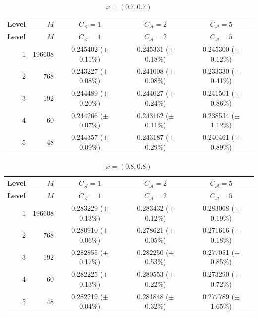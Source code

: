 \documentclass[11pt]{article}
\theoremstyle{definition}
\theoremstyle{plain}
\begin{document}
\begin{appendices}
\begin{longtable}{@{}r r c c c@{}}
\caption{$x=(0.7,0.7)$}\label{tab:mlp-x07}\\
\toprule
\textbf{Level} & \textbf{$M$} & \textbf{$C_{\mathcal A}=1$} & \textbf{$C_{\mathcal A}=2$} & \textbf{$C_{\mathcal A}=5$} \\
\midrule
\endfirsthead
\toprule
\textbf{Level} & \textbf{$M$} & \textbf{$C_{\mathcal A}=1$} & \textbf{$C_{\mathcal A}=2$} & \textbf{$C_{\mathcal A}=5$} \\
\midrule
\endhead
1 & 196608 & 0.245402 (\(\pm\) 0.11\%) & 0.245331 (\(\pm\) 0.18\%) & 0.245300 (\(\pm\) 0.12\%) \\
2 & 768    & 0.243227 (\(\pm\) 0.08\%) & 0.241008 (\(\pm\) 0.08\%) & 0.233330 (\(\pm\) 0.41\%) \\
3 & 192    & 0.244489 (\(\pm\) 0.20\%) & 0.244027 (\(\pm\) 0.24\%) & 0.241501 (\(\pm\) 0.86\%) \\
4 & 60     & 0.244266 (\(\pm\) 0.07\%) & 0.243162 (\(\pm\) 0.11\%) & 0.238534 (\(\pm\) 1.12\%) \\
5 & 48     & 0.244357 (\(\pm\) 0.09\%) & 0.243187 (\(\pm\) 0.29\%) & 0.240461 (\(\pm\) 0.89\%) \\
\bottomrule
\end{longtable}

\begin{longtable}{@{}r r c c c@{}}
\caption{$x=(0.8,0.8)$}\label{tab:mlp-x08}\\
\toprule
\textbf{Level} & \textbf{$M$} & \textbf{$C_{\mathcal A}=1$} & \textbf{$C_{\mathcal A}=2$} & \textbf{$C_{\mathcal A}=5$} \\
\midrule
\endfirsthead
\toprule
\textbf{Level} & \textbf{$M$} & \textbf{$C_{\mathcal A}=1$} & \textbf{$C_{\mathcal A}=2$} & \textbf{$C_{\mathcal A}=5$} \\
\midrule
\endhead
1 & 196608 & 0.283229 (\(\pm\) 0.13\%) & 0.283432 (\(\pm\) 0.12\%) & 0.283068 (\(\pm\) 0.19\%) \\
2 & 768    & 0.280910 (\(\pm\) 0.06\%) & 0.278621 (\(\pm\) 0.05\%) & 0.271616 (\(\pm\) 0.18\%) \\
3 & 192    & 0.282855 (\(\pm\) 0.17\%) & 0.282250 (\(\pm\) 0.53\%) & 0.277051 (\(\pm\) 0.85\%) \\
4 & 60     & 0.282225 (\(\pm\) 0.13\%) & 0.280553 (\(\pm\) 0.22\%) & 0.273290 (\(\pm\) 0.72\%) \\
5 & 48     & 0.282219 (\(\pm\) 0.04\%) & 0.281848 (\(\pm\) 0.32\%) & 0.277789 (\(\pm\) 1.65\%) \\
\bottomrule
\end{longtable}


\end{appendices}
\end{document}
